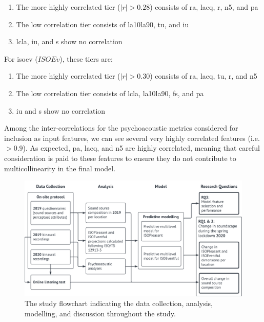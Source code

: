    \begin{enumerate}
     \item The more highly correlated tier ($|r| > 0.28$) consists of \gls{ra}, \gls{laeq}, \gls{r}, \gls{n5}, and \gls{pa}
     \item The low correlation tier consists of \gls{la10la90}, \gls{tu}, and \gls{iu}
     \item \gls{lcla}, \gls{iu}, and \gls{s} show no correlation
   \end{enumerate}

   For \gls{isoev} ($ISOEv$), these tiers are:
   \begin{enumerate}
     \item The more highly correlated tier ($|r| > 0.30$) consists of \gls{ra}, \gls{laeq}, \gls{tu}, \gls{r}, and \gls{n5}
     \item The low correlation tier consists of \gls{lcla}, \gls{la10la90}, \gls{fs}, and \gls{pa}
     \item \gls{iu} and \gls{s} show no correlation
   \end{enumerate}

   Among the inter-correlations for the psychoacoustic metrics considered for inclusion as input features, we can see several very highly correlated features (i.e. $>0.9$). As expected, \gls{pa}, \gls{laeq}, and \gls{n5} are highly correlated, meaning that careful consideration is paid to these features to ensure they do not contribute to multicollinearity in the final model.


   \begin{figure}[h]
     \centering
     \includegraphics[width=\textwidth]{Figures/Lockdown-Fig1.png}
     \caption{The study flowchart indicating the data collection, analysis, modelling, and discussion throughout the study. \label{fig:lockdown-study-framework}}
   \end{figure}

